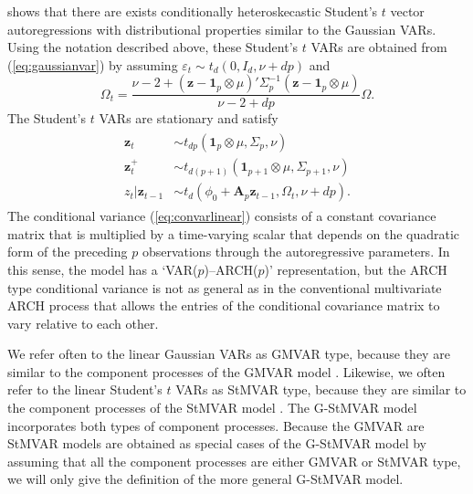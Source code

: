 \documentclass[nojss]{jss} %
\begin{document}
\cite{Virolainen2:2021} shows that there are exists conditionally heteroskecastic Student's $t$ vector autoregressions with distributional properties similar to the Gaussian VARs. Using the notation described above, these Student's $t$ VARs are obtained from (\ref{eq:gaussianvar}) by assuming $\varepsilon_t\sim t_d(0,I_d,\nu + dp)$ and
\begin{equation}
\Omega_t = \frac{\nu - 2 + (\boldsymbol{z} - \boldsymbol{1}_p\otimes\mu)'\Sigma_p^{-1}(\boldsymbol{z} - \boldsymbol{1}_p\otimes\mu)}{\nu - 2 + dp}\Omega.\label{eq:convarlinear}
\end{equation}
The Student's $t$ VARs are stationary and satisfy \citep[Theorem 1]{Virolainen2:2021}
\begin{align}\label{eq:studentdist}
\begin{aligned}
\boldsymbol{z}_t & \sim t_{dp}(\boldsymbol{1}_p\otimes\mu,\Sigma_{p},\nu) \\
\boldsymbol{z}^{+}_t & \sim t_{d(p+1)}(\boldsymbol{1}_{p+1}\otimes\mu,\Sigma_{p+1},\nu) \\
z_t|\boldsymbol{z}_{t-1} & \sim t_d(\phi_{0} + \boldsymbol{A}_p\boldsymbol{z}_{t-1}, \Omega_t, \nu + dp).
 \end{aligned}
\end{align}
The conditional variance (\ref{eq:convarlinear}) consists of a constant covariance matrix that is multiplied by a time-varying scalar that depends on the quadratic form of the preceding $p$ observations through the autoregressive parameters.  In this sense,  the model has a ‘VAR($p$)–ARCH($p$)’ representation,  but the ARCH type conditional variance is not as general as in the conventional multivariate ARCH process \citep[e.g., ][Section 16.3]{Lutkepohl:2005} that allows the entries of the conditional covariance matrix to vary relative to each other.

We refer often to the linear Gaussian VARs as GMVAR type, because they are similar to the component processes of the GMVAR model \citep{Kalliovirta+Meitz+Saikkonen:2016}. Likewise, we often refer to the linear Student's $t$ VARs as StMVAR type, because they are similar to the component processes of the StMVAR model \citep{Virolainen2:2021}. The G-StMVAR model \citep{Virolainen2:2021} incorporates both types of component processes. Because the GMVAR are StMVAR models are obtained as special cases of the G-StMVAR model by assuming that all the component processes are either GMVAR or StMVAR type, we will only give the definition of the more general G-StMVAR model.
\end{document}
